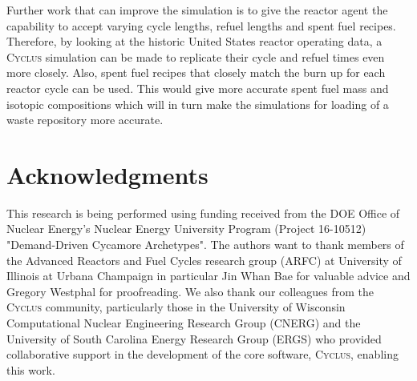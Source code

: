 \documentclass{anstrans}
\newcommand{\Cyclus}{\textsc{Cyclus}\xspace}%
\begin{document}
Further work that can improve the simulation is to give the reactor agent the capability to accept varying cycle lengths, refuel lengths and spent fuel recipes. Therefore, by looking at the historic United States reactor operating data, a \Cyclus simulation can be made to replicate their cycle and refuel times even more closely. Also, spent fuel recipes that closely match the burn up for each reactor cycle can be used. This would give more accurate spent fuel mass and isotopic compositions which will in turn make the simulations for loading of a waste repository more accurate. 

\section{Acknowledgments}
This research is being performed using funding received from the DOE Office of Nuclear Energy's
Nuclear Energy University Program (Project 16-10512) "Demand-Driven Cycamore Archetypes". The authors want to thank members of the Advanced Reactors and Fuel Cycles research group (ARFC) at University of Illinois at Urbana Champaign in particular Jin Whan Bae for valuable advice and Gregory Westphal for proofreading. We also thank our colleagues from the \Cyclus community, particularly those in the University of Wisconsin Computational Nuclear Engineering Research Group (CNERG) and the University of South Carolina Energy Research Group (ERGS) who provided collaborative support in the development of the core software, \Cyclus, enabling this work. 



\end{document}
